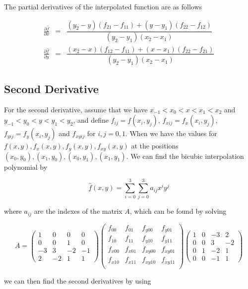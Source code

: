 The partial derivatives of the interpolated function are as follows

$$
\begin{array}{lcl} 
    \frac{\partial\hat{f}}{\partial x} & = & \dfrac{(y_2-y)(f_{21}-f_{11}) + (y-y_1)(f_{22}- f_{12})}{(y_2-y_1)(x_2-x_1)} \\
    \frac{\partial\hat{f}}{\partial y} & = & \dfrac{(x_2-x)(f_{12}-f_{11}) + (x-x_1)(f_{22}-f_{21})}{(y_2-y_1)(x_2-x_1)}
\end{array}
$$

\subsection{Second Derivative}
\label{subsec: second derivative}
For the second derivative, assume that we have $x_{-1} < x_0 < x < x_1 < x_2$ and $y_{-1} < y_0 < y < y_1 < y_2$, and define $f_{ij} = f(x_i, y_j)$, $f_{xij} = f_x(x_i,y_j)$, $f_{yij} = f_y(x_i,y_j)$ and $f_{xyij}$ for $i,j = 0, 1$. When we have the values for $f(x,y), f_x(x,y), f_y(x,y), f_{xy}(x,y)$ at the positions $(x_0, y_0), (x_1, y_0), (x_0, y_1), (x_1, y_1)$. We can find the bicubic interpolation polynomial by

$$
\hat{f}(x,y) = \sum_{i=0}^3 \sum_{j=0}^3 a_{ij}x^i y^j
$$

where $a_{ij}$ are the indexes of the matrix $A$, which can be found by solving

$$
A = \begin{pmatrix}
    1&0&0&0 \\
    0&0&1&0 \\
    -3&3&-2&-1 \\
    2&-2&1&1
\end{pmatrix} \begin{pmatrix}
    f_{00}&f_{01}&f_{y00}&f_{y01} \\
    f_{10}&f_{11}&f_{y10}&f_{y11} \\
    f_{x00}&f_{x01}&f_{xy00}&f_{xy01} \\
    f_{x10}&f_{x11}&f_{xy10}&f_{xy11} \\
\end{pmatrix} \begin{pmatrix}
    1&0&-3&2 \\
    0&0&3&-2 \\
    0&1&-2&1 \\
    0&0&-1&1
\end{pmatrix}
$$


we can then find the second derivatives by using


